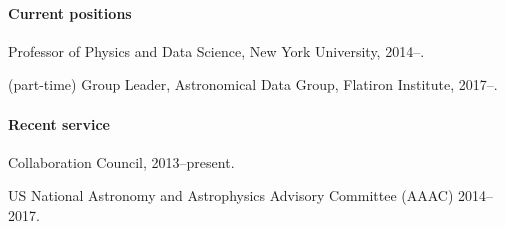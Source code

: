 \documentclass[12pt]{article}
\begin{document}
\paragraph{Current positions}
\begin{list}{}{\hogglist}
\item
Professor of Physics and Data Science, New York University, 2014--.
\item
(part-time) Group Leader, Astronomical Data Group, Flatiron Institute, 2017--.
\end{list}

\paragraph{Recent service}
\begin{list}{}{\hogglist}
\item
{} Collaboration Council,
2013--present.
\item
US National Astronomy and Astrophysics Advisory Committee (AAAC)
2014--2017.
\end{list}
\end{document}
